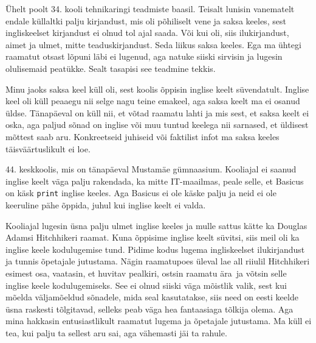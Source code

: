 
Ühelt poolt 34. kooli tehnikaringi teadmiste baasil. Teisalt lunisin vanematelt 
endale küllaltki palju kirjandust, mis oli põhiliselt vene ja saksa 
keeles, sest ingliskeelset kirjandust ei olnud tol ajal saada. Või 
kui oli, siis ilukirjandust, aimet ja ulmet, mitte 
teaduskirjandust. Seda liikus saksa keeles. Ega ma ühtegi
raamatut otsast lõpuni läbi ei lugenud, aga 
natuke siiski sirvisin ja lugesin olulisemaid peatükke. Sealt 
tasapisi see teadmine tekkis.


Minu jaoks saksa keel küll oli, sest koolis õppisin inglise keelt 
süvendatult. Inglise keel oli küll peaaegu nii selge nagu teine emakeel, aga saksa keelt ma ei osanud üldse. 
Tänapäeval on küll nii, et võtad raamatu lahti ja mis sest, et saksa 
keelt ei oska, aga paljud sõnad on inglise või muu tuntud keelega nii sarnased, et üldisest mõttest saab aru. 
Konkreetseid juhiseid või faktilist infot ma saksa keeles 
täisväärtuslikult ei loe. 


44. keskkoolis, mis on tänapäeval Mustamäe 
gümnaasium. Kooliajal ei saanud inglise keelt väga palju rakendada, ka mitte 
IT-maailmas,
peale selle, et Basicus on käsk \verb|print| inglise keeles. Aga 
Basicus ei ole käske palju ja neid ei ole keeruline pähe 
õppida, juhul kui inglise keelt ei valda. 


Kooliajal lugesin üsna palju ulmet inglise keeles ja 
mulle sattus kätte ka Douglas Adamsi Hitchhikeri raamat.
Kuna õppisime inglise keelt süvitsi, siis meil oli ka
inglise keele kodulugemise tund. Pidime kodus lugema ingliskeelset
ilukirjandust ja tunnis õpetajale jutustama. Nägin raamatupoes 
üleval lae all riiulil Hitchhikeri esimest osa, 
vaatasin, et huvitav pealkiri, ostsin raamatu ära ja võtsin selle inglise keele kodulugemiseks. See ei olnud siiski väga mõistlik 
valik, sest kui mõelda väljamõeldud sõnadele, mida seal kasutatakse, siis need on 
eesti keelde üsna raskesti tõlgitavad, selleks peab väga hea fantaasiaga tõlkija 
olema. Aga mina hakkasin entusiastlikult raamatut lugema ja õpetajale jutustama. Ma 
küll ei tea, kui palju ta sellest aru sai, aga vähemasti jäi ta rahule. 

